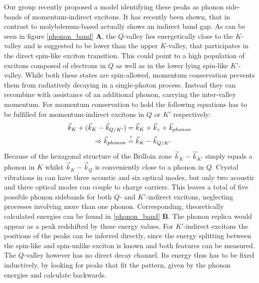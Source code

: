 Our group recently proposed a model identifying these peaks as phonon side-bands of momentum-indirect excitons\cite{lindlau_identifying_2017}. It has recently been shown, that in contrast to molybdenum-based \tmds \wse actually shows an indirect band gap\cite{zhang_probing_2015, hsu_evidence_2017}. As can be seen in figure \ref{phonon_band} \textbf{A}, the $Q$-valley lies energetically close to the $K$-valley and is suggested to be lower than the upper $K$-valley, that participates in the direct spin-like exciton transition. This could point to a high population of excitons composed of electrons in $Q$ as well as in the lower lying spin-like $K'$-valley. While both these states are spin-allowed, momentum conservation prevents them from radiatively decaying in a single-photon process. Instead they can recombine with assistance of an additional phonon, carrying the inter-valley momentum. For momentum conservation to hold the following equations has to be fulfilled for momentum-indirect excitons in $Q$ or $K'$ respectively:
\begin{align}
	\vec{k}_K + (\vec{k}_K - \vec{k}_{Q/K'}) &= \vec{k}_K + \vec{k}_\gamma + \vec{k}_{phonon}\\
	\Rightarrow \vec{k}_{phonon} &\overset{!}{=} \vec{k}_K - \vec{k}_{Q/K'}
\end{align}
Because of the hexagonal structure of the Brilloin zone $\vec{k}_K - \vec{k}_{K'}$ simply equals a phonon in $K$ whilst $\vec{k}_K - \vec{k}_{Q}$ is conveniently close to a phonon in $Q$. Crystal vibrations in \tmds can have three acoustic and six optical modes, but only two acoustic and three optical modes can couple to charge carriers. This leaves a total of five possible phonon sidebands for both $Q$- and $K'$-indirect excitons, neglecting processes involving more than one phonon. Corresponding, theoretically calculated energies can be found in \ref{phonon_band} \textbf{B}\cite{jin_intrinsic_2014}. The phonon replica would appear as a peak redshifted by these energy values. For $K'$-indirect excitons the positions of the peaks can be inferred directly, since the energy splitting between the spin-like and spin-unlike exciton is known and both features can be measured. The $Q$-valley however has no direct decay channel. Its energy thus has to be fixed inductively, by looking for peaks that fit the pattern, given by the phonon energies and calculate backwards.

\begin{figure}[t]
\centering

\end{figure}
\cite{van_der_donck_excitons_2018} 

